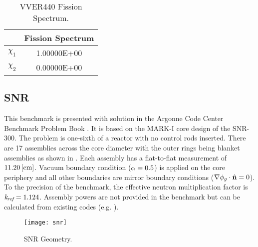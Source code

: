     \begin{table}
      \caption{VVER440 Fission Spectrum.}
      \label{tab:vver440chi}
      \begin{center}
        \begin{tabular}{cc}
          \toprule
          &Fission Spectrum \\
          \midrule
          $\chi_1$ & 1.00000E+00  \\
          $\chi_2$ & 0.00000E+00  \\
          \bottomrule
        \end{tabular}
      \end{center}
    \end{table}

  \subsection{SNR}
    \label{sec:snr}
    This benchmark is presented with solution in the Argonne Code Center
    Benchmark Problem Book \cite{argonneBenchmark}. It is based on the MARK-I
    core design of the SNR-300. The problem is one-sixth of a reactor with no
    control rods inserted. There are 17 assemblies across the core diameter with
    the outer rings being blanket assemblies as shown in .
    Each assembly has a flat-to-flat measurement of ${11.20 \left[\text{{cm}}\right]}$. Vacuum
    boundary condition ($\alpha = 0.5$) is applied on the core periphery and
    all other boundaries are mirror boundary conditions ($\mathbf{\nabla} \phi_g \cdot
    \hat{\mathbf{n}} = 0$). To the precision of the benchmark, the effective neutron
    multiplication factor is $k_{\!\mbox{\scriptsize \em ref}} = 1.124$.  Assembly powers are not provided
    in the benchmark but can be calculated from existing codes (e.g. \dif).

    \begin{figure}
      \centering
      \texttt{[image: snr]}
      \caption{SNR Geometry.}
      \label{fig:snr_geom}
    \end{figure}

